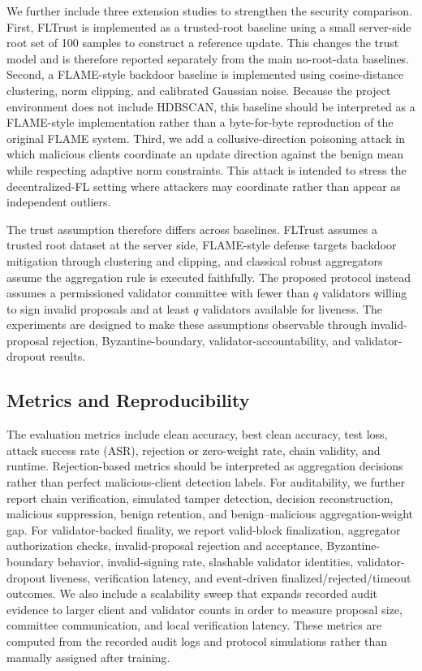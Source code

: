 \documentclass[preprint,12pt]{elsarticle}
\begin{document}
We further include three extension studies to strengthen the security comparison. First, FLTrust is implemented as a trusted-root baseline using a small server-side root set of 100 samples to construct a reference update. This changes the trust model and is therefore reported separately from the main no-root-data baselines. Second, a FLAME-style backdoor baseline is implemented using cosine-distance clustering, norm clipping, and calibrated Gaussian noise. Because the project environment does not include HDBSCAN, this baseline should be interpreted as a FLAME-style implementation rather than a byte-for-byte reproduction of the original FLAME system. Third, we add a collusive-direction poisoning attack in which malicious clients coordinate an update direction against the benign mean while respecting adaptive norm constraints. This attack is intended to stress the decentralized-FL setting where attackers may coordinate rather than appear as independent outliers.

The trust assumption therefore differs across baselines. FLTrust assumes a trusted root dataset at the server side, FLAME-style defense targets backdoor mitigation through clustering and clipping, and classical robust aggregators assume the aggregation rule is executed faithfully. The proposed protocol instead assumes a permissioned validator committee with fewer than $q$ validators willing to sign invalid proposals and at least $q$ validators available for liveness. The experiments are designed to make these assumptions observable through invalid-proposal rejection, Byzantine-boundary, validator-accountability, and validator-dropout results.

\subsection{Metrics and Reproducibility}

The evaluation metrics include clean accuracy, best clean accuracy, test loss, attack success rate (ASR), rejection or zero-weight rate, chain validity, and runtime. Rejection-based metrics should be interpreted as aggregation decisions rather than perfect malicious-client detection labels. For auditability, we further report chain verification, simulated tamper detection, decision reconstruction, malicious suppression, benign retention, and benign--malicious aggregation-weight gap. For validator-backed finality, we report valid-block finalization, aggregator authorization checks, invalid-proposal rejection and acceptance, Byzantine-boundary behavior, invalid-signing rate, slashable validator identities, validator-dropout liveness, verification latency, and event-driven finalized/rejected/timeout outcomes. We also include a scalability sweep that expands recorded audit evidence to larger client and validator counts in order to measure proposal size, committee communication, and local verification latency. These metrics are computed from the recorded audit logs and protocol simulations rather than manually assigned after training.
\end{document}
